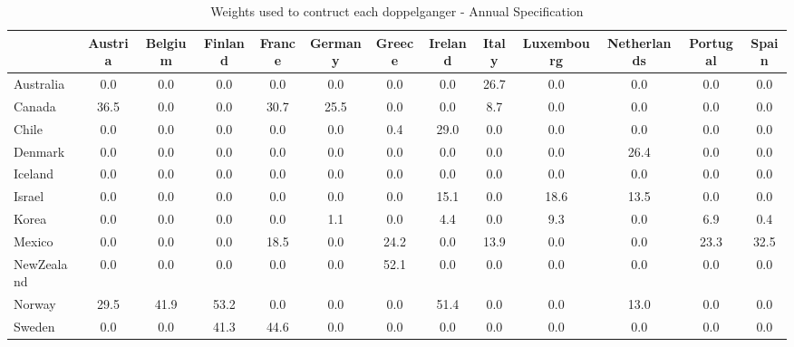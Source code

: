 \begin{table}[htbp]
\caption{\label{clabel} Weights used to contruct each doppelganger - Annual Specification}\centering\medskip
\begin{tabular}{lcccccccccccc} \hline \hline
 & Austria  & Belgium  & Finland  & France  & Germany  & Greece  & Ireland  & Italy  & Luxembourg  & Netherlands  & Portugal  & Spain  \\  \hline 
Australia &       0.0 &       0.0 &       0.0 &       0.0 &       0.0 &       0.0 &       0.0 &      26.7 &       0.0 &       0.0 &       0.0 &       0.0 \\  
Canada &      36.5 &       0.0 &       0.0 &      30.7 &      25.5 &       0.0 &       0.0 &       8.7 &       0.0 &       0.0 &       0.0 &       0.0 \\  
Chile &       0.0 &       0.0 &       0.0 &       0.0 &       0.0 &       0.4 &      29.0 &       0.0 &       0.0 &       0.0 &       0.0 &       0.0 \\  
Denmark &       0.0 &       0.0 &       0.0 &       0.0 &       0.0 &       0.0 &       0.0 &       0.0 &       0.0 &      26.4 &       0.0 &       0.0 \\  
Iceland &       0.0 &       0.0 &       0.0 &       0.0 &       0.0 &       0.0 &       0.0 &       0.0 &       0.0 &       0.0 &       0.0 &       0.0 \\  
Israel &       0.0 &       0.0 &       0.0 &       0.0 &       0.0 &       0.0 &      15.1 &       0.0 &      18.6 &      13.5 &       0.0 &       0.0 \\  
Korea &       0.0 &       0.0 &       0.0 &       0.0 &       1.1 &       0.0 &       4.4 &       0.0 &       9.3 &       0.0 &       6.9 &       0.4 \\  
Mexico &       0.0 &       0.0 &       0.0 &      18.5 &       0.0 &      24.2 &       0.0 &      13.9 &       0.0 &       0.0 &      23.3 &      32.5 \\  
NewZealand &       0.0 &       0.0 &       0.0 &       0.0 &       0.0 &      52.1 &       0.0 &       0.0 &       0.0 &       0.0 &       0.0 &       0.0 \\  
Norway &      29.5 &      41.9 &      53.2 &       0.0 &       0.0 &       0.0 &      51.4 &       0.0 &       0.0 &      13.0 &       0.0 &       0.0 \\  
Sweden &       0.0 &       0.0 &      41.3 &      44.6 &       0.0 &       0.0 &       0.0 &       0.0 &       0.0 &       0.0 &       0.0 &       0.0 \\  

\end{tabular}
\end{table}
